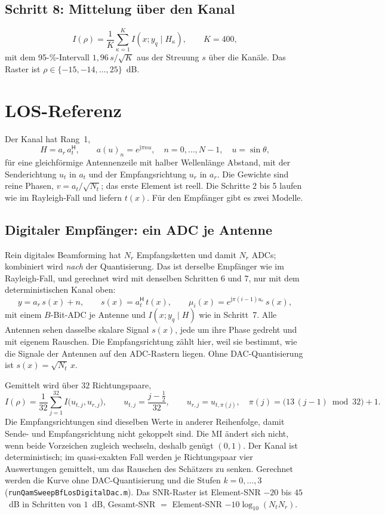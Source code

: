 \documentclass[11pt,a4paper]{article}
\newcommand{\file}[1]{\texttt{#1}}
\newcommand{\schritt}[1]{\subsection*{Schritt #1}}
\begin{document}
\schritt{8: Mittelung über den Kanal}
\begin{equation}
I(\rho)=\frac1K\sum_{\kappa=1}^K I(x;y_q\mid H_\kappa),\qquad K=400 ,
\end{equation}
mit dem 95-\%-Intervall $1{,}96\,s/\sqrt K$ aus der Streuung $s$ über die Kanäle. Das Raster ist
$\rho\in\{-15,-14,\dots,25\}$~dB.

\section{LOS-Referenz}\label{sec:los}

Der Kanal hat Rang~1,
\begin{equation}
H=a_r\,a_t^{\mathsf H},\qquad a(u)_n=e^{\mathrm j\pi nu},\quad n=0,\dots,N-1,\quad u=\sin\theta ,
\end{equation}
für eine gleichförmige Antennenzeile mit halber Wellenlänge Abstand, mit der Senderichtung $u_t$
in $a_t$ und der Empfangsrichtung $u_r$ in $a_r$. Die Gewichte sind reine Phasen,
$v=a_t/\sqrt{N_t}$; das erste Element ist reell. Die Schritte 2 bis 5 laufen wie im
Rayleigh-Fall und liefern $t(x)$. Für den Empfänger gibt es zwei Modelle.

\subsection{Digitaler Empfänger: ein ADC je Antenne}\label{sec:losd}

Rein digitales Beamforming hat $N_r$ Empfangsketten und damit $N_r$ ADCs; kombiniert wird
\emph{nach} der Quantisierung. Das ist derselbe Empfänger wie im Rayleigh-Fall, und gerechnet wird
mit denselben Schritten 6 und 7, nur mit dem deterministischen Kanal oben:
\begin{equation}
y=a_r\,s(x)+n,\qquad s(x)=a_t^{\mathsf H}\,t(x),\qquad \mu_i(x)=e^{\mathrm j\pi(i-1)u_r}\,s(x),
\end{equation}
mit einem $B$-Bit-ADC je Antenne und $I(x;y_q\mid H)$ wie in Schritt~7. Alle Antennen sehen
dasselbe skalare Signal $s(x)$, jede um ihre Phase gedreht und mit eigenem Rauschen. Die
Empfangsrichtung zählt hier, weil sie bestimmt, wie die Signale der Antennen auf den ADC-Rastern
liegen. Ohne DAC-Quantisierung ist $s(x)=\sqrt{N_t}\,x$.

Gemittelt wird über $32$ Richtungspaare,
\begin{equation}
I(\rho)=\frac1{32}\sum_{j=1}^{32}I\bigl(u_{t,j},u_{r,j}\bigr),\qquad
u_{t,j}=\frac{j-\tfrac12}{32},\qquad u_{r,j}=u_{t,\pi(j)},\quad \pi(j)=\bigl(13\,(j-1)\bmod 32\bigr)+1 .
\end{equation}
Die Empfangsrichtungen sind dieselben Werte in anderer Reihenfolge, damit Sende- und
Empfangsrichtung nicht gekoppelt sind. Die MI ändert sich nicht, wenn beide Vorzeichen zugleich
wechseln, deshalb genügt $(0,1)$. Der Kanal ist deterministisch; im quasi-exakten Fall werden je
Richtungspaar vier Auswertungen gemittelt, um das Rauschen des Schätzers zu senken. Gerechnet
werden die Kurve ohne DAC-Quantisierung und die Stufen $k=0,\dots,3$
(\file{runQamSweepBfLosDigitalDac.m}). Das SNR-Raster ist Element-SNR $-20$ bis $45$~dB in
Schritten von $1$~dB, Gesamt-SNR $=$ Element-SNR $-10\log_{10}(N_tN_r)$.
\end{document}
